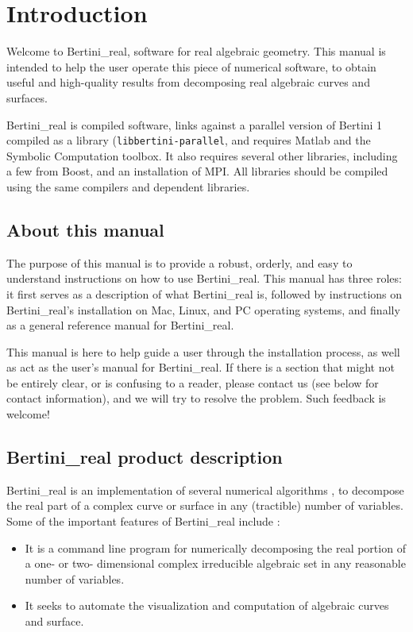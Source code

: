 
\section{Introduction}


Welcome to Bertini\_real, software for real algebraic geometry.  This manual is intended to help the user operate this piece of numerical software, to obtain useful and high-quality results from decomposing real algebraic curves and surfaces.

Bertini\_real is compiled software, links against a parallel version of Bertini 1 compiled as a library ({\tt libbertini-parallel}, and requires Matlab and the Symbolic Computation toolbox.  It also requires several other libraries, including a few from Boost, and an installation of MPI.  All libraries should be compiled using the same compilers and dependent libraries.  



\subsection{About this manual}
The purpose of this manual is to provide a robust, orderly, and easy to understand instructions on how to use Bertini\_real. This manual has three roles: it first serves as a description of what Bertini\_real is, followed by instructions on Bertini\_real's installation on Mac, Linux, and PC operating systems, and finally as a general reference manual for Bertini\_real.
	
This manual is here to help guide a user through the installation process, as well as act as the user's manual for Bertini\_real. If there is a section that might not be entirely clear, or is confusing to a reader, please contact us (see below for contact information), and we will try to resolve the problem. Such feedback is welcome!


\subsection{Bertini\_real product description}
	Bertini\_real is an implementation of several numerical algorithms \cite{lu2007finding,besana2013cell}, to decompose the real part of a complex curve or surface in any (tractible) number of variables.
	Some of the important features of Bertini\_real include :
\begin{itemize}
\item It is a command line program for numerically decomposing the real portion of a one- or two- dimensional complex irreducible algebraic  set in any reasonable number of variables.
\item It seeks to automate the visualization and computation of algebraic curves and surface.
\end{itemize}




